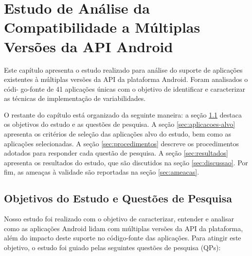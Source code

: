 \chapter{Estudo de Análise da Compatibilidade a Múltiplas Versões da API Android}
\label{ch:estudo}

Este capítulo apresenta o estudo realizado para análise do suporte de aplicações
existentes à múltiplas versões da API da plataforma Android. Foram analisados o
códi- go-fonte de 41 aplicações únicas com o objetivo de identificar e caracterizar
as técnicas de implementação de variabilidades.

O restante do capítulo está organizado da seguinte maneira: 
a seção \ref{sec:objetivos} destaca os objetivos do estudo e as questões de pesquisa.
A seção \ref{sec:aplicacoes-alvo} apresenta os critérios de seleção das aplicações
alvo do estudo, bem como as aplicações selecionadas.
A seção \ref{sec:procedimentos} descreve os procedimentos adotados para responder
cada questão de pesquisa. 
A seção \ref{sec:resultados} apresenta os resultados do estudo, que são discutidos na
seção \ref{sec:discussao}.
Por fim, as ameaças à validade são reportadas na seção \ref{sec:ameacas}.

\section{Objetivos do Estudo e Questões de Pesquisa} \label{sec:objetivos}

Nosso estudo foi realizado com o objetivo de caracterizar, entender e analisar
como as aplicações Android lidam com múltiplas versões da API da plataforma, além
do impacto deste suporte no código-fonte das aplicações. Para atingir este objetivo,
o estudo foi guiado pelas seguintes questões de pesquisa (QPs):

